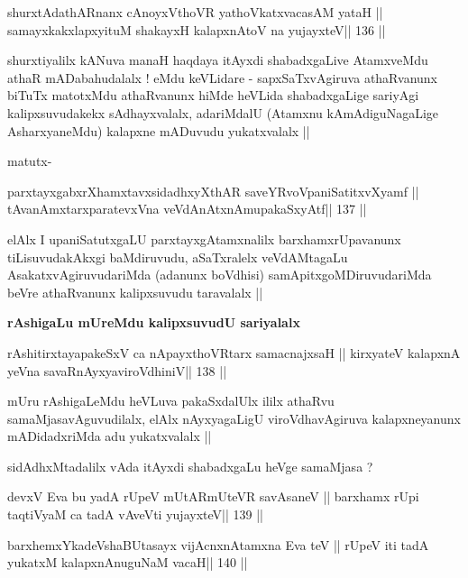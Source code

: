 \begin{shl}
shurxtAdathARnanx cAnoyxV\s thoVR yathoVkatxvacasAM yataH ||
samayxkakxlapxyituM shakayxH kalapxnA\s toV na yujayxteV\hfill || 136 ||
\end{shl}

\begin{artha}
shurxtiyalilx kANuva manaH haqdaya itAyxdi shabadxgaLive AtamxveMdu
  athaR mADabahudalalx ! eMdu keVLidare - sapxSaTxvAgiruva athaRvanunx
  biTuTx matotxMdu athaRvanunx hiMde heVLida shabadxgaLige sariyAgi
  kalipxsuvudakekx sAdhayxvalalx, adariMdalU (Atamxnu kAmAdiguNagaLige
  AsharxyaneMdu) kalapxne mADuvudu yukatxvalalx ||

matutx- 
\end{artha}

\begin{shl}
parxtayxgabxrXhamxtavxsidadhxyXthAR saveYRvoVpaniSatitxvXyamf ||
tAvanAmxtarxparatevxVna veVdAnAtxnAmupakaSxyAtf\hfill || 137 ||
\end{shl}

\begin{artha}
elAlx I upaniSatutxgaLU parxtayxgAtamxnalilx barxhamxrUpavanunx
tiLisuvudakAkxgi baMdiruvudu, aSaTxralelx veVdAMtagaLu
AsakatxvAgiruvudariMda (adanunx boVdhisi) samApitxgoMDiruvudariMda
beVre athaRvanunx kalipxsuvudu taravalalx ||
\end{artha}

\begin{center}
{\textbf{rAshigaLu mUreMdu kalipxsuvudU sariyalalx}}
\end{center}

\begin{shl}
rAshitirxtayapakeSxV ca nApayxthoVR\s tarx samacnajxsaH ||
kirxyateV kalapxnA yeVna savaRnAyxyaviroVdhiniV\hfill || 138 ||
\end{shl}

\begin{artha}
mUru rAshigaLeMdu heVLuva pakaSxdalUlx ililx athaRvu
samaMjasavAguvudilalx, elAlx nAyxyagaLigU viroVdhavAgiruva
kalapxneyanunx mADidadxriMda adu yukatxvalalx ||

sidAdhxMtadalilx vAda itAyxdi shabadxgaLu heVge samaMjasa ? 
\end{artha}

\begin{shl}
devxV Eva bu yadA rUpeV mUtARmUteVR savAsaneV ||
barxhamx rUpi taqtiVyaM ca tadA vAveVti yujayxteV\hfill || 139 ||
\end{shl}

\begin{shl}
barxhemxYkadeVshaBUtasayx vijAcnxnAtamxna Eva teV ||
rUpeV iti tadA yukatxM kalapxnAnuguNaM vacaH\hfill || 140 ||
\end{shl}

